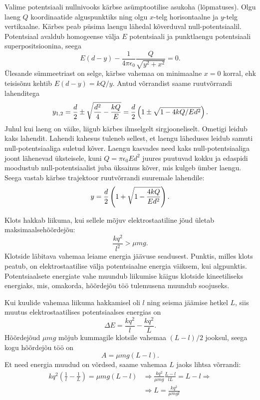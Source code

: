 \documentclass[10pt, twoside]{article}
\begin{document}
{%

\solu
Valime potentsiaali nullnivooks kärbse asümptootilise asukoha (lõpmatuses). 
Olgu laeng $Q$ koordinaatide alguspunktiks ning olgu $x$-telg horisontaalne ja $y$-telg vertikaalne. 
Kärbes peab püsima laengu lähedal kõverduval null-potentsiaalil. 
Potentsiaal avaldub homogeense välja $E$ potentsiaali ja punktlaengu potentsiaali superpositsioonina, seega 
\[
E(d - y) - \frac{1}{4\pi\epsilon_0}\frac{Q}{\sqrt{y^2 + x^2}} = 0.
\]
Ülesande sümmeetriast on selge, kärbse vahemaa on minimaalne $x=0$ korral, ehk teisisõnu kehtib $E(d-y) = kQ/y$. Antud võrrandist saame ruutvõrrandi lahenditega
\[
y_{1,2} = {d \over 2} \pm \sqrt{\frac {d^2}4 - {kQ \over E}} = {d \over 2}\left( 1 \pm \sqrt{1 - 4kQ / Ed^2}\right).
\] 
Juhul kui laeng on väike, liigub kärbes ilmselgelt sirgjooneliselt. Ometigi leidub kaks lahendit. Lahendi kahesus tuleneb sellest, et laengu läheduses leidub samuti
null-potentsiaaliga suletud kõver. Laengu kasvades need kaks null-potentsiaaliga joont lähenevad üksteisele, kuni $Q=\pi\epsilon_0Ed^2$ juures 
puutuvad kokku ja edaspidi moodustub null-potentsiaalist juba üksainus kõver, mis kulgeb ümber laengu. 
Seega vastab kärbse trajektoor ruutvõrrandi suuremale lahendile:
$$y= {d \over 2}\left(1 + \sqrt{1 - {4kQ \over Ed^2}}\right).$$
\probend
\bigskip


\solu
Klots hakkab liikuma, kui sellele mõjuv elektrostaatiline jõud ületab maksimaalsehõõrdejõu:
\[
\frac{kq^2}{l^2} > \mu mg.
\]
Klotside läbitava vahemaa leiame energia jäävuse seadusest. Punktis, milles klots peatub, on elektrostaatilise välja potentsiaalne energia väiksem, kui algpunktis. Potentsiaalsete energiate vahe muundub liikumise käigus klotside kineetiliseks energiaks, mis, omakorda, hõõrdejõu töö tulemusena muundub soojuseks.

Kui kuulide vahemaa liikuma hakkamisel oli $l$ ning seisma jäämise hetkel $L$, siis muutus elektrostaatilises potentsiaalses energias on
\[
\Delta E = \frac{kq^2}{l} - \frac{kq^2}{L}.
\]
Hõõrdejõud $\mu mg$ mõjub kummagile klotsile vahemaa $(L-l)/2$ jooksul, seega kogu
hõõrdejõu töö on
\[
A = \mu mg (L - l).
\]
Et need energia muudud on võrdsed, saame vahemaa $L$ jaoks lihtsa võrrandi:
\[
\begin{aligned}
k q^{2}\left(\frac{1}{l}-\frac{1}{L}\right)=\mu m g(L-l) &\Rightarrow \frac{k q^{2}}{\mu m g} \frac{L-l}{l L}=L-l \Rightarrow\\
&\Rightarrow L=\frac{k q^{2}}{\mu m g l}
\end{aligned}
\]
\probend
\bigskip

}
\end{document}
